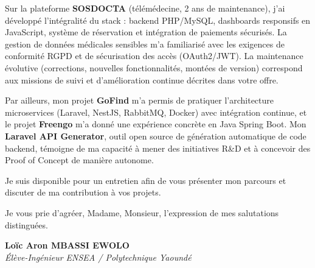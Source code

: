 \documentclass[a4paper,11pt]{article}
\begin{document}
Sur la plateforme \textbf{SOSDOCTA} (télémédecine, 2 ans de maintenance), j'ai développé l'intégralité du stack : backend PHP/MySQL, dashboards responsifs en JavaScript, système de réservation et intégration de paiements sécurisés. La gestion de données médicales sensibles m'a familiarisé avec les exigences de conformité RGPD et de sécurisation des accès (OAuth2/JWT). La maintenance évolutive (corrections, nouvelles fonctionnalités, montées de version) correspond aux missions de suivi et d'amélioration continue décrites dans votre offre.

Par ailleurs, mon projet \textbf{GoFind} m'a permis de pratiquer l'architecture microservices (Laravel, NestJS, RabbitMQ, Docker) avec intégration continue, et le projet \textbf{Freengo} m'a donné une expérience concrète en Java Spring Boot. Mon \textbf{Laravel API Generator}, outil open source de génération automatique de code backend, témoigne de ma capacité à mener des initiatives R\&D et à concevoir des Proof of Concept de manière autonome.

Je suis disponible pour un entretien afin de vous présenter mon parcours et discuter de ma contribution à vos projets.

Je vous prie d'agréer, Madame, Monsieur, l'expression de mes salutations distinguées.

\vspace{0.8cm}

\textbf{Loïc Aron MBASSI EWOLO}\\
\textit{Élève-Ingénieur ENSEA / Polytechnique Yaoundé}
\end{document}
